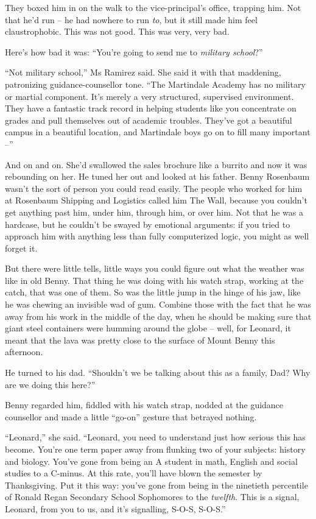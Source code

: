 They boxed him in on the walk to the vice-principal's office,
trapping him. Not that he'd run -- he had nowhere to run \emph{to},
but it still made him feel claustrophobic. This was not good. This
was very, very bad.

Here's how bad it was: ``You're going to send me to
\emph{military school}?''

``Not military school,'' Ms Ramirez said. She said it with that
maddening, patronizing guidance-counsellor tone. ``The Martindale
Academy has no military or martial component. It's merely a very
structured, supervised environment. They have a fantastic track
record in helping students like you concentrate on grades and pull
themselves out of academic troubles. They've got a beautiful campus
in a beautiful location, and Martindale boys go on to fill many
important --''

And on and on. She'd swallowed the sales brochure like a burrito
and now it was rebounding on her. He tuned her out and looked at
his father. Benny Rosenbaum wasn't the sort of person you could
read easily. The people who worked for him at Rosenbaum Shipping
and Logistics called him The Wall, because you couldn't get
anything past him, under him, through him, or over him. Not that he
was a hardcase, but he couldn't be swayed by emotional arguments:
if you tried to approach him with anything less than fully
computerized logic, you might as well forget it.

But there were little tells, little ways you could figure out what
the weather was like in old Benny. That thing he was doing with his
watch strap, working at the catch, that was one of them. So was the
little jump in the hinge of his jaw, like he was chewing an
invisible wad of gum. Combine those with the fact that he was away
from his work in the middle of the day, when he should be making
sure that giant steel containers were humming around the globe --
well, for Leonard, it meant that the lava was pretty close to the
surface of Mount Benny this afternoon.

He turned to his dad. ``Shouldn't we be talking about this as a
family, Dad? Why are we doing this here?''

Benny regarded him, fiddled with his watch strap, nodded at the
guidance counsellor and made a little ``go-on'' gesture that betrayed
nothing.

``Leonard,'' she said. ``Leonard, you need to understand just how
serious this has become. You're one term paper away from flunking
two of your subjects: history and biology. You've gone from being
an A student in math, English and social studies to a C-minus. At
this rate, you'll have blown the semester by Thanksgiving. Put it
this way: you've gone from being in the ninetieth percentile of
Ronald Regan Secondary School Sophomores to the \emph{twelfth}.
This is a signal, Leonard, from you to us, and it's signalling,
S-O-S, S-O-S.''

